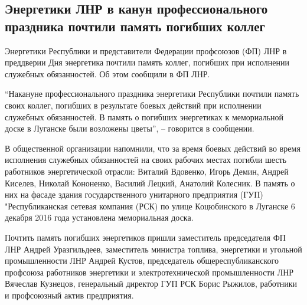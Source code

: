  
 
 
 
 
\subsection{Энергетики ЛНР в канун профессионального праздника почтили память погибших коллег}
\label{sec:22_12_2021.stz.news.lnr.lug_info.1.energetiki_pamjat}


Энергетики Республики и представители Федерации профсоюзов (ФП) ЛНР в
преддверии Дня энергетика почтили память коллег, погибших при исполнении
служебных обязанностей. Об этом сообщили в ФП ЛНР.


\enquote{Накануне профессионального праздника энергетики Республики почтили память
своих коллег, погибших в результате боевых действий при исполнении служебных
обязанностей. В память о погибших энергетиках к мемориальной доске в Луганске
были возложены цветы}, – говорится в сообщении.

В общественной организации напомнили, что за время боевых действий во время
исполнения служебных обязанностей на своих рабочих местах погибли шесть
работников энергетической отрасли: Виталий Вдовенко, Игорь Демин, Андрей
Киселев, Николай Кононенко, Василий Лецкий, Анатолий Колесник. В память о них
на фасаде здания государственного унитарного предприятия (ГУП) "Республиканская
сетевая компания (РСК) по улице Коцюбинского в Луганске 6 декабря 2016 года
установлена мемориальная доска.


Почтить память погибших энергетиков пришли заместитель председателя ФП ЛНР
Андрей Уразгильдеев, заместитель министра топлива, энергетики и угольной
промышленности ЛНР Андрей Кустов, председатель общереспубликанского профсоюза
работников энергетики и электротехнической промышленности ЛНР Вячеслав
Кузнецов, генеральный директор ГУП РСК Борис Рыжилов, работники и профсоюзный
актив предприятия.

